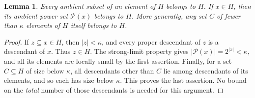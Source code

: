 \documentclass[11pt]{article}
\newtheorem{lemma}{Lemma}
\newcommand{\Pow}{\mathcal P}
\begin{document}
\begin{lemma}\label{lem:closure}
Every ambient subset of an element of $H$ belongs to $H$.  If $x\in H$, then
its ambient power set $\Pow(x)$ belongs to $H$.  More generally, any set $C$
of fewer than $\kappa$ elements of $H$ itself belongs to $H$.
\end{lemma}
\begin{proof}
If $z\subseteq x\in H$, then $|z|<\kappa$, and every proper descendant of
$z$ is a descendant of $x$.  Thus $z\in H$.  The strong-limit property gives
$|\Pow(x)|=2^{|x|}<\kappa$, and all its elements are locally small by the
first assertion.  Finally, for a set $C\subseteq H$ of size below $\kappa$,
all descendants other than $C$ lie among descendants of its elements, and
so each has size below $\kappa$.  This proves the last assertion.  No bound
on the \emph{total} number of those descendants is needed for this argument.
\end{proof}
\end{document}
